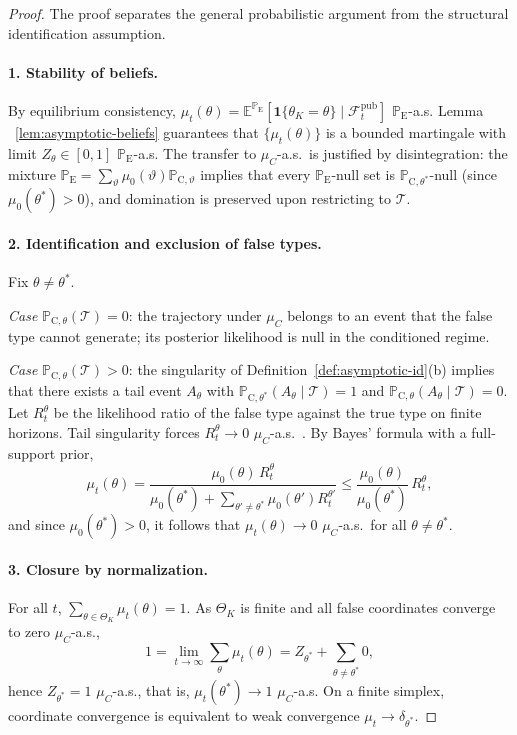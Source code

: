 \documentclass[ecta,nameyear,final,supplement]{econsocart}
\numberwithin{equation}{section}
\numberwithin{table}{section}
\theoremstyle{definition}
\newcommand{\E}{\mathbb{E}}
\newcommand{\ProbE}{\mathbb{P}_{\mathrm{E}}}
\newcommand{\ProbC}[1]{\mathbb{P}_{\mathrm{C},#1}}
\begin{document}
\begin{proof}
The proof separates the general probabilistic argument from the structural
identification assumption.

\paragraph{1. Stability of beliefs.}
By equilibrium consistency,
$\mu_t(\theta)=\E^{\ProbE}[\mathbf{1}\{\theta_K=\theta\}\mid
\mathcal{F}_t^{\mathrm{pub}}]$ $\ProbE$-a.s. Lemma
~\ref{lem:asymptotic-beliefs} guarantees that $\{\mu_t(\theta)\}$ is a
bounded martingale with limit $Z_\theta\in[0,1]$ $\ProbE$-a.s. The
transfer to $\mu_C$-a.s.\ is justified by disintegration: the mixture
$\ProbE=\sum_\vartheta\mu_0(\vartheta)\ProbC{\vartheta}$ implies that every
$\ProbE$-null set is $\ProbC{\theta^\ast}$-null (since
$\mu_0(\theta^\ast)>0$), and domination is preserved upon restricting to
$\mathcal{T}$.

\paragraph{2. Identification and exclusion of false types.}
Fix $\theta\neq\theta^\ast$.

\emph{Case} $\ProbC{\theta}(\mathcal{T})=0$: the trajectory under $\mu_C$
belongs to an event that the false type cannot generate; its posterior
likelihood is null in the conditioned regime.

\emph{Case} $\ProbC{\theta}(\mathcal{T})>0$: the singularity of
Definition~\ref{def:asymptotic-id}(b) implies that there exists a tail event
$A_\theta$ with
$\ProbC{\theta^\ast}(A_\theta\mid\mathcal{T})=1$ and
$\ProbC{\theta}(A_\theta\mid\mathcal{T})=0$.
Let $R_t^\theta$ be the likelihood ratio of the false type against the true
type on finite horizons. Tail singularity forces
$R_t^\theta\to 0$ $\mu_C$-a.s.\
\citep{BlackwellDubins1962,Schervish1995Theory}.
By Bayes' formula with a full-support prior,
\[
\mu_t(\theta)
=\frac{\mu_0(\theta)\,R_t^\theta}
      {\mu_0(\theta^\ast)+\sum_{\theta'\neq\theta^\ast}\mu_0(\theta')R_t^{\theta'}}
\le\frac{\mu_0(\theta)}{\mu_0(\theta^\ast)}\,R_t^\theta,
\]
and since $\mu_0(\theta^\ast)>0$, it follows that
$\mu_t(\theta)\to 0$ $\mu_C$-a.s.\ for all $\theta\neq\theta^\ast$.

\paragraph{3. Closure by normalization.}
For all $t$, $\sum_{\theta\in\Theta_K}\mu_t(\theta)=1$. As $\Theta_K$ is
finite and all false coordinates converge to zero $\mu_C$-a.s.,
\[
1=\lim_{t\to\infty}\sum_\theta\mu_t(\theta)
=Z_{\theta^\ast}+\sum_{\theta\neq\theta^\ast}0,
\]
hence $Z_{\theta^\ast}=1$ $\mu_C$-a.s., that is,
$\mu_t(\theta^\ast)\to 1$ $\mu_C$-a.s. On a finite simplex, coordinate
convergence is equivalent to weak convergence $\mu_t\to\delta_{\theta^\ast}$.
\end{proof}
\end{document}

